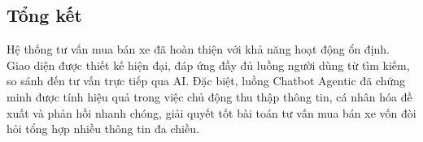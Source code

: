 \subsection{Tổng kết}
Hệ thống tư vấn mua bán xe đã hoàn thiện với khả năng hoạt động ổn định. Giao diện được thiết kế hiện đại, đáp ứng đầy đủ luồng người dùng từ tìm kiếm, so sánh đến tư vấn trực tiếp qua AI. Đặc biệt, luồng Chatbot Agentic đã chứng minh được tính hiệu quả trong việc chủ động thu thập thông tin, cá nhân hóa đề xuất và phản hồi nhanh chóng, giải quyết tốt bài toán tư vấn mua bán xe vốn đòi hỏi tổng hợp nhiều thông tin đa chiều.
